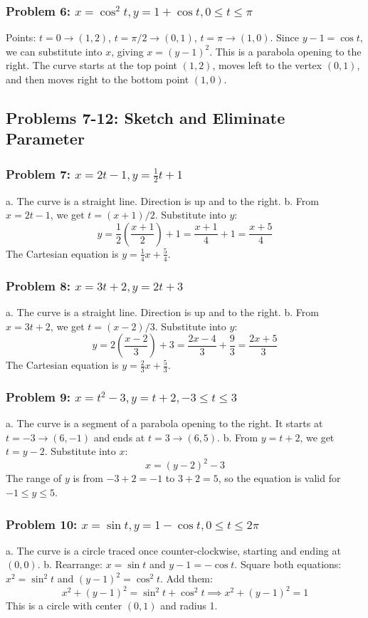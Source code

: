 \documentclass{article}
\begin{document}
\subsubsection{Problem 6: \(x = \cos^2 t, y = 1 + \cos t, 0 \le t \le \pi\)}
Points: \(t=0 \to (1, 2)\), \(t=\pi/2 \to (0, 1)\), \(t=\pi \to (1, 0)\).
Since \(y-1 = \cos t\), we can substitute into \(x\), giving \(x = (y-1)^2\). This is a parabola opening to the right. The curve starts at the top point \((1, 2)\), moves left to the vertex \((0, 1)\), and then moves right to the bottom point \((1, 0)\).

\subsection{Problems 7-12: Sketch and Eliminate Parameter}

\subsubsection{Problem 7: \(x = 2t - 1, y = \frac{1}{2}t + 1\)}
a. The curve is a straight line. Direction is up and to the right.
b. From \(x = 2t - 1\), we get \(t = (x+1)/2\). Substitute into \(y\):
\[y = \frac{1}{2}\left(\frac{x+1}{2}\right) + 1 = \frac{x+1}{4} + 1 = \frac{x+5}{4}\]
The Cartesian equation is \(y = \frac{1}{4}x + \frac{5}{4}\).

\subsubsection{Problem 8: \(x = 3t + 2, y = 2t + 3\)}
a. The curve is a straight line. Direction is up and to the right.
b. From \(x = 3t + 2\), we get \(t = (x-2)/3\). Substitute into \(y\):
\[y = 2\left(\frac{x-2}{3}\right) + 3 = \frac{2x-4}{3} + \frac{9}{3} = \frac{2x+5}{3}\]
The Cartesian equation is \(y = \frac{2}{3}x + \frac{5}{3}\).

\subsubsection{Problem 9: \(x = t^2 - 3, y = t + 2, -3 \le t \le 3\)}
a. The curve is a segment of a parabola opening to the right. It starts at \(t=-3 \to (6, -1)\) and ends at \(t=3 \to (6, 5)\).
b. From \(y = t + 2\), we get \(t = y - 2\). Substitute into \(x\):
\[x = (y-2)^2 - 3\]
The range of \(y\) is from \(-3+2=-1\) to \(3+2=5\), so the equation is valid for \(-1 \le y \le 5\).

\subsubsection{Problem 10: \(x = \sin t, y = 1 - \cos t, 0 \le t \le 2\pi\)}
a. The curve is a circle traced once counter-clockwise, starting and ending at \((0,0)\).
b. Rearrange: \(x = \sin t\) and \(y-1 = -\cos t\). Square both equations: \(x^2 = \sin^2 t\) and \((y-1)^2 = \cos^2 t\). Add them:
\[x^2 + (y-1)^2 = \sin^2 t + \cos^2 t \implies x^2 + (y-1)^2 = 1\]
This is a circle with center \((0, 1)\) and radius 1.
\end{document}
